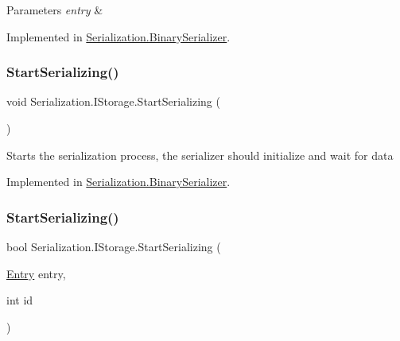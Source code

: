 \begin{DoxyParams}{Parameters}
{\em entry} & \\
\hline
\end{DoxyParams}


Implemented in \hyperlink{class_serialization_1_1_binary_serializer_a9b376977bd19d9bfef1fce28e110220a}{Serialization.\+Binary\+Serializer}.

\mbox{\label{interface_serialization_1_1_i_storage_a0f040f49872c3bf4ba92a350494e45af}} 
\subsubsection{\texorpdfstring{Start\+Serializing()}{StartSerializing()}\hspace{0.1cm}{\footnotesize\ttfamily [1/2]}}
{\footnotesize\ttfamily void Serialization.\+I\+Storage.\+Start\+Serializing (\begin{DoxyParamCaption}{ }\end{DoxyParamCaption})}



Starts the serialization process, the serializer should initialize and wait for data 



Implemented in \hyperlink{class_serialization_1_1_binary_serializer_a7266eb0f6366fe0d40bbcb9d4434f262}{Serialization.\+Binary\+Serializer}.

\mbox{\label{interface_serialization_1_1_i_storage_a62f447c10caea0bd0c2ec3bad36fe14a}} 
\subsubsection{\texorpdfstring{Start\+Serializing()}{StartSerializing()}\hspace{0.1cm}{\footnotesize\ttfamily [2/2]}}
{\footnotesize\ttfamily bool Serialization.\+I\+Storage.\+Start\+Serializing (\begin{DoxyParamCaption}\item[{\hyperlink{class_serialization_1_1_entry}{Entry}}]{entry,  }\item[{int}]{id }\end{DoxyParamCaption})}



